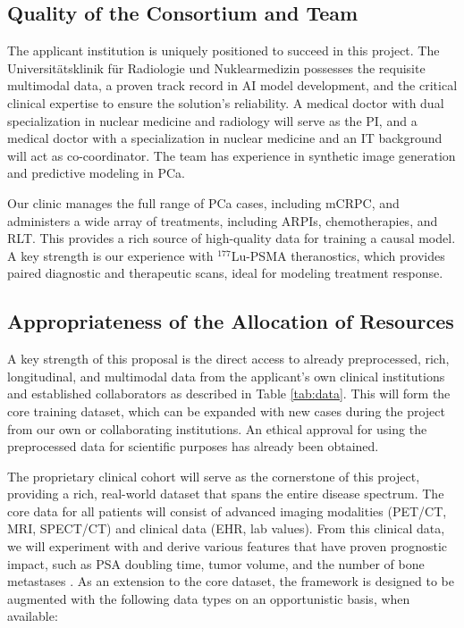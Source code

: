 \documentclass[11pt, a4paper]{article}
\begin{document}
\subsection{Quality of the Consortium and Team}
The applicant institution is uniquely positioned to succeed in this project. The Universitätsklinik für Radiologie und Nuklearmedizin possesses the requisite multimodal data, a proven track record in AI model development, and the critical clinical expertise to ensure the solution's reliability. A medical doctor with dual specialization in nuclear medicine and radiology will serve as the PI, and a medical doctor with a specialization in nuclear medicine and an IT background will act as co-coordinator. The team has experience in synthetic image generation and predictive modeling in PCa.

Our clinic manages the full range of PCa cases, including mCRPC, and administers a wide array of treatments, including ARPIs, chemotherapies, and RLT. This provides a rich source of high-quality data for training a causal model. A key strength is our experience with $^{177}$Lu-PSMA theranostics, which provides paired diagnostic and therapeutic scans, ideal for modeling treatment response.

\subsection{Appropriateness of the Allocation of Resources}
A key strength of this proposal is the direct access to already preprocessed, rich, longitudinal, and multimodal data from the applicant's own clinical institutions and established collaborators as described in Table \ref{tab:data}. This will form the core training dataset, which can be expanded with new cases during the project from our own or collaborating institutions. An ethical approval for using the preprocessed data for scientific purposes has already been obtained.

The proprietary clinical cohort will serve as the cornerstone of this project, providing a rich, real-world dataset that spans the entire disease spectrum. The core data for all patients will consist of advanced imaging modalities (PET/CT, MRI, SPECT/CT) and clinical data (EHR, lab values). From this clinical data, we will experiment with and derive various features that have proven prognostic impact, such as PSA doubling time, tumor volume, and the number of bone metastases \cite{guidelines_uro_1,guidelines_uro_2}. As an extension to the core dataset, the framework is designed to be augmented with the following data types on an opportunistic basis, when available:
\end{document}
